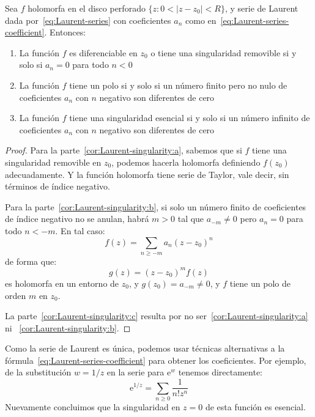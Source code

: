   \begin{corollary}
    \label{cor:Laurent-singularity}
    Sea \(f\) holomorfa en el disco perforado
      \(\{ z \colon 0 < \lvert z - z_0 \rvert < R \}\),
    y serie de Laurent dada por~\eqref{eq:Laurent-series}
    con coeficientes \(a_n\)
    como en~\eqref{eq:Laurent-series-coefficient}.
    Entonces:
    \begin{enumerate}[label=(\alph*), ref=(\alph*)]
    \item
      \label{cor:Laurent-singularity:a}
      La función \(f\) es diferenciable en \(z_0\)
      o tiene una singularidad removible si y solo si
      \(a_n = 0\) para todo \(n < 0\)
    \item
      \label{cor:Laurent-singularity:b}
      La función \(f\) tiene un polo
      si y solo si un número finito pero no nulo
      de coeficientes \(a_n\) con \(n\) negativo
      son diferentes de cero
    \item
      \label{cor:Laurent-singularity:c}
      La función \(f\) tiene una singularidad esencial
      si y solo si un número infinito de coeficientes \(a_n\)
      con \(n\) negativo son diferentes de cero
    \end{enumerate}
  \end{corollary}
  \begin{proof}
    Para la parte~\ref{cor:Laurent-singularity:a},
    sabemos que si \(f\)
    tiene una singularidad removible en \(z_0\),
    podemos hacerla holomorfa definiendo \(f(z_0)\) adecuadamente.
    Y la función holomorfa tiene serie de Taylor,
    vale decir,
    sin términos de índice negativo.

    Para la parte~\ref{cor:Laurent-singularity:b},
    si solo un número finito de coeficientes de índice negativo
    no se anulan,
    habrá \(m > 0\) tal que \(a_{-m} \ne 0\)
    pero \(a_n = 0\) para todo \(n < -m\).
    En tal caso:
    \begin{equation*}
      f(z)
	= \sum_{n  \ge -m} a_n (z - z_0)^n
    \end{equation*}
    de forma que:
    \begin{equation*}
      g(z)
	= (z - z_0)^m f(z)
    \end{equation*}
    es holomorfa en un entorno de \(z_0\),
    y \(g(z_0) = a_{-m} \ne 0\),
    y \(f\) tiene un polo de orden \(m\) en \(z_0\).

    La parte~\ref{cor:Laurent-singularity:c}
    resulta por no ser~\ref{cor:Laurent-singularity:a}
    ni ~\ref{cor:Laurent-singularity:b}.
  \end{proof}
  Como la serie de Laurent es única,
  podemos usar técnicas alternativas
  a la fórmula~\eqref{eq:Laurent-series-coefficient}
  para obtener los coeficientes.
  Por ejemplo,
  de la substitución \(w = 1 / z\) en la serie para \(\mathrm{e}^w\)
  tenemos directamente:
  \begin{equation*}
    \mathrm{e}^{1/z}
      = \sum_{n \ge 0} \frac{1}{n! z^n}
  \end{equation*}
  Nuevamente concluimos
  que la singularidad en \(z = 0\) de esta función
  es esencial.

